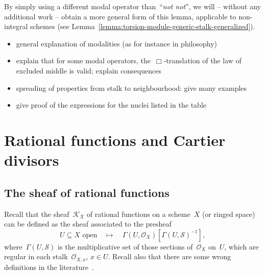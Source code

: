\documentclass[10pt]{amsart}
\theoremstyle{definition}
\theoremstyle{plain}
\theoremstyle{remark}
\renewcommand{\O}{\mathcal{O}}
\newcommand{\K}{\mathcal{K}}
\renewcommand{\S}{\mathcal{S}}
\newcommand{\?}{\,{:}\,}
\renewcommand{\_}{\mathpunct{.}\,}
\newcommand{\notnot}{\emph{not not}\xspace}
\begin{document}
By simply using a different modal operator than~``\notnot'', we will -- without
any additional work -- obtain a more general form of this lemma, applicable to
non-integral schemes (see Lemma~\ref{lemma:torsion-module-generic-stalk-generalized}).

\begin{itemize}
\item general explanation of modalities (as for instance in philosophy)
\item explain that for some modal operators, the~$\Box$-translation of the law
of excluded middle is valid; explain consequences
\item spreading of properties from stalk to neighbourhood: give many examples
\item give proof of the expressions for the nuclei listed in the table
\end{itemize}


\section{Rational functions and Cartier divisors}
\label{sect:rational-functions}

\subsection{The sheaf of rational functions} Recall that the sheaf~$\K_X$ of rational
functions on a scheme~$X$ (or ringed space) can be defined as the sheaf
associated to the presheaf
\[ \text{$U \subseteq X$ open} \quad\longmapsto\quad \Gamma(U,\O_X)[\Gamma(U,\S)^{-1}], \]
where~$\Gamma(U,\S)$ is the multiplicative set of those sections of~$\O_X$ on~$U$,
which are regular in each stalk~$\O_{X,x}$, $x \in U$. Recall also that there are
some wrong definitions in the literature~\cite{kleiman:misconceptions}.
\end{document}
